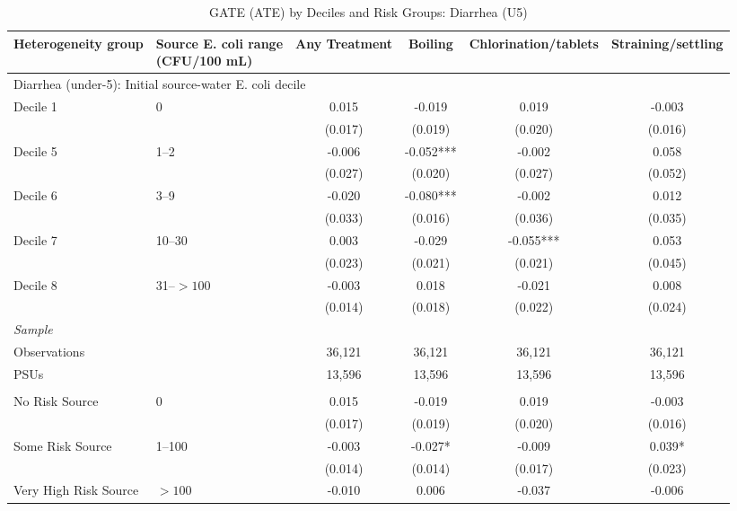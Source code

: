 \begin{landscape}
\begin{table}[p]
\centering
\caption{GATE (ATE) by Deciles and Risk Groups: Diarrhea (U5)}
\label{tab:table_gate_main-diarrhea}
\scriptsize\setlength{\tabcolsep}{4pt}
\begin{adjustbox}{max width=\linewidth, center}
\begin{tabular}{llcccc}
\toprule
Heterogeneity group & \shortstack{Source E. coli range\\(CFU/100 mL)} & Any Treatment & Boiling & Chlorination/tablets & Straining/settling \\
\midrule
\multicolumn{6}{l}{Diarrhea (under-5): Initial source-water E. coli decile} \\
Decile 1 & 0 & 0.015 & -0.019 & 0.019 & -0.003 \\
 &  & (0.017) & (0.019) & (0.020) & (0.016) \\
Decile 5 & 1--2 & -0.006 & -0.052*** & -0.002 & 0.058 \\
 &  & (0.027) & (0.020) & (0.027) & (0.052) \\
Decile 6 & 3--9 & -0.020 & -0.080*** & -0.002 & 0.012 \\
 &  & (0.033) & (0.016) & (0.036) & (0.035) \\
Decile 7 & 10--30 & 0.003 & -0.029 & -0.055*** & 0.053 \\
 &  & (0.023) & (0.021) & (0.021) & (0.045) \\
Decile 8 & 31--$>100$ & -0.003 & 0.018 & -0.021 & 0.008 \\
 &  & (0.014) & (0.018) & (0.022) & (0.024) \\
\multicolumn{6}{l}{\textit{Sample}} \\
\quad Observations &  & 36,121 & 36,121 & 36,121 & 36,121 \\
\quad PSUs &  & 13,596 & 13,596 & 13,596 & 13,596 \\
\addlinespace[4pt]
\multicolumn{6}{l}{Diarrhea (under-5): Initial source-water E. coli risk} \\
No Risk Source & 0 & 0.015 & -0.019 & 0.019 & -0.003 \\
 &  & (0.017) & (0.019) & (0.020) & (0.016) \\
Some Risk Source & 1--100 & -0.003 & -0.027* & -0.009 & 0.039* \\
 &  & (0.014) & (0.014) & (0.017) & (0.023) \\
Very High Risk Source & $>100$ & -0.010 & 0.006 & -0.037 & -0.006 \\

\end{tabular}
\end{adjustbox}
\end{table}
\end{landscape}
